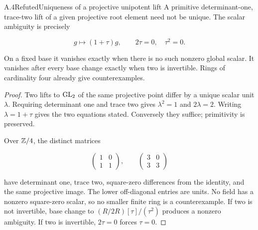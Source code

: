 \begin{statement}{A.4}{Refuted}{Uniqueness of a projective unipotent lift}
A primitive determinant-one, trace-two lift of a given projective
root element need not be unique. The scalar ambiguity is precisely

$$
g\longmapsto(1+\tau)g,\qquad 2\tau=0,\quad \tau^2=0.
$$

On a fixed base it vanishes exactly when there is no such nonzero
global scalar. It vanishes after every base change exactly when
two is invertible. Rings of cardinality four already give
counterexamples.
\end{statement}
\begin{proof}
Two lifts to $\operatorname{GL}_2$ of the same projective point differ by a
unique scalar unit $\lambda$. Requiring determinant one and
trace two gives $\lambda^2=1$ and $2\lambda=2$.
Writing $\lambda=1+\tau$ gives the two equations stated.
Conversely they suffice; primitivity is preserved.

Over $\mathbb Z/4$, the distinct matrices

$$
\begin{pmatrix}1&0\\1&1\end{pmatrix},\qquad
 \begin{pmatrix}3&0\\3&3\end{pmatrix}
$$

have determinant one, trace two, square-zero differences from
the identity, and the same projective image.
The lower off-diagonal entries are units.
No field has a nonzero square-zero scalar, so no smaller finite
ring is a counterexample. If two is not invertible, base change
to $(R/2R)[\tau]/(\tau^2)$ produces a nonzero ambiguity.
If two is invertible, $2\tau=0$ forces $\tau=0$.
\end{proof}

